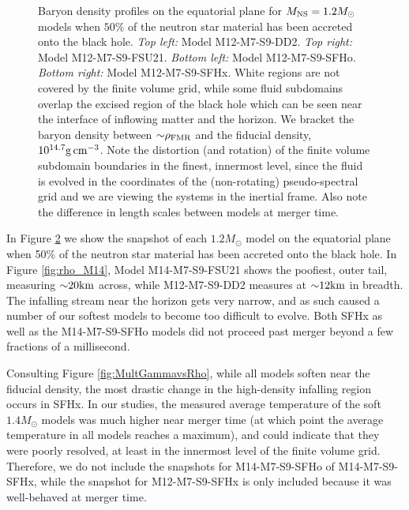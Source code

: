 \begin{figure}
\begin{subfigure}[b]{0.475\textwidth}
		\label{fig:rho_M12_SFHx}
	\end{subfigure}
	\caption[Density profiles on equatorial plane for $1.2 M_{\odot}$ models]{
		Baryon density profiles on the equatorial plane for $M_{\rm NS} = 1.2 M_{\odot}$ models when $50\%$ of the neutron star material has been accreted onto the black hole.
		\textit{Top left:} Model M12-M7-S9-DD2.
		\textit{Top right:} Model M12-M7-S9-FSU21.
		\textit{Bottom left:} Model M12-M7-S9-SFHo.
		\textit{Bottom right:} Model M12-M7-S9-SFHx.
		White regions are not covered by the finite volume grid, while some fluid subdomains overlap the excised region of the black hole which can be seen near the interface of inflowing matter and the horizon.  We bracket the baryon density between $\mathord{\sim} \rho_{\rm FMR}$ and the fiducial density, $10^{14.7} {\rm g\,cm^{-3}}$. Note the distortion (and rotation) of the finite volume subdomain boundaries in the finest, innermost level, since the fluid is evolved in the coordinates of the (non-rotating) pseudo-spectral grid and we are viewing the systems in the inertial frame.  Also note the difference in length scales between models at merger time.
	}
	\label{fig:rho_M12}
\end{figure}

In Figure \ref{fig:rho_M12} we show the snapshot of each $1.2 M_\odot$ model on the equatorial plane when 50\% of the neutron star material has been accreted onto the black hole.  In Figure \ref{fig:rho_M14}, Model M14-M7-S9-FSU21 shows the poofiest, outer tail, measuring $\mathord{\sim} 20 {\rm km}$ across, while M12-M7-S9-DD2 measures at $\mathord{\sim} 12 {\rm km}$ in breadth.  The infalling stream near the horizon gets very narrow, and as such caused a number of our softest models to become too difficult to evolve.  Both SFHx as well as the M14-M7-S9-SFHo models did not proceed past merger beyond a few fractions of a millisecond.  

Consulting Figure \ref{fig:MultGammavsRho}, while all models soften near the fiducial density, the most drastic change in the high-density infalling region occurs in SFHx.  In our studies, the measured average temperature of the soft $1.4 M_\odot$ models was much higher near merger time (at which point the average temperature in all models reaches a maximum), and could indicate that they were poorly resolved, at least in the innermost level of the finite volume grid.  Therefore, we do not include the snapshots for M14-M7-S9-SFHo of M14-M7-S9-SFHx, while the snapshot for M12-M7-S9-SFHx is only included because it was well-behaved at merger time.

